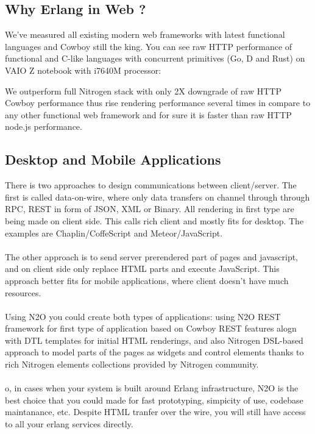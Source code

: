 \documentclass[11pt]{article}
\begin{document}
\subsection*{Why Erlang in Web ?}
We've measured all existing modern web frameworks with latest functional languages and Cowboy still the king.
You can see raw HTTP performance of functional and C-like languages with concurrent primitives (Go, D and Rust)
on VAIO Z notebook with i7640M processor:


We outperform full Nitrogen stack with only 2X downgrade of raw HTTP Cowboy
performance thus rise rendering performance several times in compare to
any other functional web framework and for sure it is faster than raw HTTP node.js performance.

\subsection*{Desktop and Mobile Applications}
There is two approaches to design communications between client/server.
The first is called data-on-wire, where only data transfers on channel
through through RPC, REST in form of JSON, XML or Binary. All rendering
in first type are being made on client side. This calls rich client and
mostly fits for desktop. The examples are Chaplin/CoffeScript and Meteor/JavaScript.
\paragraph{}
The other approach is to send server prerendered part of pages and javascript,
and on client side only replace HTML parts and execute JavaScript. This approach
better fits for mobile applications, where client doesn't have much resources.
\paragraph{}
Using N2O you could create both types of applications: using N2O REST framework
for first type of application based on Cowboy REST features alogn with DTL
templates for initial HTML renderings, and also Nitrogen DSL-based approach
to model parts of the pages as widgets and control elements thanks to rich
Nitrogen elements collections provided by Nitrogen community.
\paragraph{}
o, in cases when your system is built around Erlang infrastructure, N2O
is the best choice that you could made for fast prototyping, simpicity
of use, codebase maintanance, etc. Despite HTML tranfer over the wire,
you will still have access to all your erlang services directly.
\end{document}
